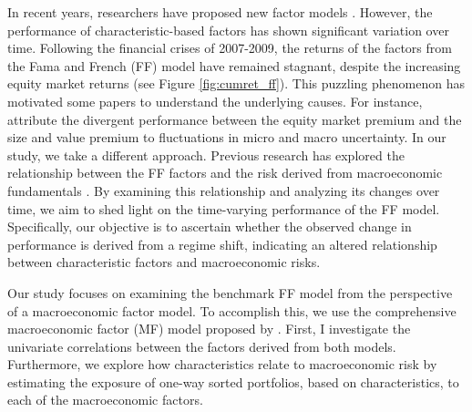 \documentclass[11pt,halfline,a4paper]{ouparticle}
\begin{document}
In recent years, researchers have proposed new factor models \citep[e.g.,][]{fama2018choosing,fama2015five,hou2021augmented}. However, the performance of characteristic-based factors has shown significant variation over time. Following the financial crises of 2007-2009, the returns of the factors from the Fama and French (FF) model have remained stagnant, despite the increasing equity market returns (see Figure \ref{fig:cumret_ff}). This puzzling phenomenon has motivated some papers to understand the underlying causes. For instance, \cite{herskovic2023micro} attribute the divergent performance between the equity market premium and the size and value premium to fluctuations in micro and macro uncertainty. In our study, we take a different approach. Previous research has explored the relationship between the FF factors and the risk derived from macroeconomic fundamentals \citep[e.g.,][]{aretz2010macroeconomic,hahn2006yield,petkova2006fama,vassalou2004default,vassalou2003news,liew2000can}. By examining this relationship and analyzing its changes over time, we aim to shed light on the time-varying performance of the FF model. Specifically, our objective is to ascertain whether the observed change in performance is derived from a regime shift, indicating an altered relationship between characteristic factors and macroeconomic risks. 






Our study focuses on examining the benchmark FF model from the perspective of a macroeconomic factor model. To accomplish this, we use the comprehensive macroeconomic factor (MF) model proposed by \cite{aretz2010macroeconomic}. First, I investigate the univariate correlations between the factors derived from both models. Furthermore, we explore how characteristics relate to macroeconomic risk by estimating the exposure of one-way sorted portfolios, based on characteristics, to each of the macroeconomic factors. 
\end{document}
